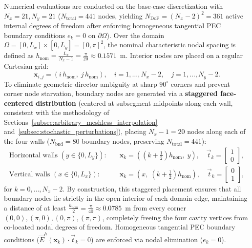 \documentclass[preprint,12pt]{elsarticle}
\begin{document}
Numerical evaluations are conducted on the base-case discretization with $N_x = 21, N_y = 21$ ($N_{\mathrm{total}} = 441$ nodes, yielding $N_{\mathrm{DoF}} = (N_x - 2)^2 = 361$ active internal degrees of freedom after enforcing homogeneous tangential PEC boundary conditions $e_k = 0$ on $\partial\Omega$). Over the domain $\Omega = [0, L_x] \times [0, L_y] = [0, \pi]^2$, the nominal characteristic nodal spacing is defined as $h_{\mathrm{nom}} = \frac{L_x}{N_x - 1} = \frac{\pi}{20} \approx 0.1571$~m. Interior nodes are placed on a regular Cartesian grid:
\begin{equation}
    \mathbf{x}_{i,j} = \left(i \, h_{\mathrm{nom}}, \; j \, h_{\mathrm{nom}}\right), \quad i = 1, \dots, N_x - 2, \quad j = 1, \dots, N_y - 2.
    \label{eq:regular_grid_coords}
\end{equation}
To eliminate geometric director ambiguity at sharp $90^\circ$ corners and prevent corner node starvation, boundary nodes are generated via a \textbf{staggered face-centered distribution} (centered at subsegment midpoints along each wall, consistent with the methodology of Sections~\ref{subsec:arbitrary_meshless_interpolation} and~\ref{subsec:stochastic_perturbations}), placing $N_x - 1 = 20$ nodes along each of the four walls ($N_{\mathrm{bnd}} = 80$ boundary nodes, preserving $N_{\mathrm{total}} = 441$):
\begin{align}
    \text{Horizontal walls } (y \in \{0, L_y\}): \quad & \mathbf{x}_k = \left( \left(k + \frac{1}{2}\right) h_{\mathrm{nom}}, \; y \right), \quad \vec{t}_k = \begin{bmatrix} 1 \\ 0 \end{bmatrix}, \label{eq:staggered_bnd_horiz} \\
    \text{Vertical walls } (x \in \{0, L_x\}): \quad   & \mathbf{x}_k = \left( x, \; \left(k + \frac{1}{2}\right) h_{\mathrm{nom}} \right), \quad \vec{t}_k = \begin{bmatrix} 0 \\ 1 \end{bmatrix}, \label{eq:staggered_bnd_vert}
\end{align}
for $k = 0, \dots, N_x - 2$. By construction, this staggered placement ensures that all boundary nodes lie strictly in the open interior of each domain edge, maintaining a distance of at least $\frac{h_{\mathrm{nom}}}{2} = \frac{\pi}{40} \approx 0.0785$~m from every corner $(0,0), (\pi,0), (0,\pi), (\pi,\pi)$, completely freeing the four cavity vertices from co-located nodal degrees of freedom. Homogeneous tangential PEC boundary conditions ($\vec{E}^h(\mathbf{x}_k) \cdot \vec{t}_k = 0$) are enforced via nodal elimination ($e_k = 0$).
\end{document}
